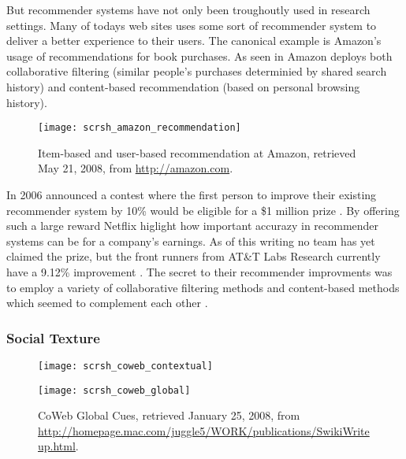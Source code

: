 But recommender systems have not only been troughoutly used in research
settings. Many of todays web sites uses some sort of recommender system to
deliver a better experience to their users. The canonical example is Amazon's%
usage of recommendations for book purchases. As seen in
Amazon deploys both collaborative filtering (similar people's purchases
determinied by shared search history) and content-based recommendation (based
on personal browsing history).

\begin{figure}
  \centering
  \texttt{[image: scrsh\_amazon\_recommendation]}
  \caption[Recommendations at Amazon]{
    Item-based and user-based recommendation at Amazon,
    retrieved May 21, 2008, from
    \url{http://amazon.com}.
  }
  \label{figure:scrsh.amazon.recommendation}
\end{figure}

In 2006 %
announced a contest where the first person to improve their existing
recommender system by 10\% would be eligible for a \$1 million prize
\citep[]{segaran07}. By offering such a large reward Netflix
higlight how important accurazy in recommender systems can be for a company's
earnings. As of this writing no team has yet claimed the prize, but the front
runners from AT\&T Labs Research currently have a 9.12\% improvement
\citep{netflix08}. The secret to their recommender improvments was to employ
a variety of collaborative filtering methods and content-based methods which
seemed to complement each other \citep[]{bell07}.

\subsubsection{Social Texture}

\begin{figure}
  \captionstyle{\raggedright}
  \begin{whole}
    \begin{minipage}[t]{0.475\wholewidth}
      \texttt{[image: scrsh\_coweb\_contextual]}
      \caption[CoWeb Contextual Cues]{%
        CoWeb Contextual Cues,
        retrieved January 25, 2008, from
        \url{http://homepage.mac.com/juggle5/WORK/publications/SwikiWriteup.html}.
      }
      \label{figure:scrsh.coweb.contextual}
    \end{minipage}
    \hfill
    \begin{minipage}[t]{0.475\wholewidth}
      \texttt{[image: scrsh\_coweb\_global]}
      \caption[CoWeb Global Cues]{%
        CoWeb Global Cues,
        retrieved January 25, 2008, from
        \url{http://homepage.mac.com/juggle5/WORK/publications/SwikiWriteup.html}.
      }
      \label{figure:scrsh.coweb.global}
    \end{minipage}
  \end{whole}
  \normalcaption
\end{figure}


